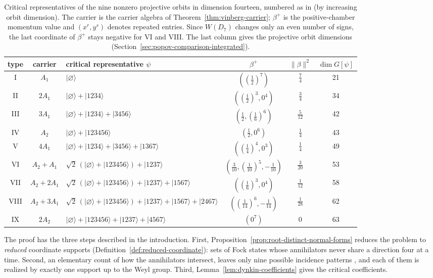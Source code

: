 \documentclass{article}
\theoremstyle{definition}
\theoremstyle{remark}
\newcommand{\ket}[1]{\lvert #1\rangle}
\newcommand{\norm}[1]{\lVert #1\rVert}
\begin{document}
\begin{table}[t]
\centering
\renewcommand{\arraystretch}{1.18}
\small
\begin{tabular}{c c l c c c}
\toprule
type & carrier & critical representative $\psi$ & $\beta^+$ &
$\norm\beta^2$ &
$\dim G[\psi]$\\
\midrule
I & $A_1$ & $\ket\varnothing$
  & $((\frac12)^7)$ & $\frac74$ & 21\\
II & $2A_1$ & $\ket\varnothing+\ket{1234}$
  & $((\frac12)^3,0^4)$ & $\frac34$ & 34\\
III & $3A_1$ & $\ket\varnothing+\ket{1234}+\ket{3456}$
  & $(\frac12,(\frac16)^6)$ & $\frac5{12}$ & 42\\
IV & $A_2$ & $\ket\varnothing+\ket{123456}$
  & $(\frac12,0^6)$ & $\frac14$ & 43\\
V & $4A_1$ & $\ket\varnothing+\ket{1234}+\ket{3456}+\ket{1367}$
  & $((\frac14)^4,0^3)$ & $\frac14$ & 49\\
VI & $A_2{+}A_1$ & $\sqrt2\,(\ket\varnothing+\ket{123456})+\ket{1237}$
  & $(\frac3{10},(\frac1{10})^5,-\frac1{10})$ & $\frac3{20}$ & 53\\
VII & $A_2{+}2A_1$ & $\sqrt2\,(\ket\varnothing+\ket{123456})+\ket{1237}+\ket{1567}$
  & $((\frac16)^3,0^4)$ & $\frac1{12}$ & 58\\
VIII & $A_2{+}3A_1$ & $\sqrt2\,(\ket\varnothing+\ket{123456})+\ket{1237}+\ket{1567}+\ket{2467}$
  & $((\frac1{14})^6,-\frac1{14})$ & $\frac1{28}$ & 62\\
IX & $2A_2$ & $\ket\varnothing+\ket{123456}+\ket{1237}+\ket{4567}$
  & $(0^7)$ & $0$ & 63\\
\bottomrule
\end{tabular}
\caption{Critical representatives of the nine nonzero projective orbits in
dimension fourteen, numbered as in \cite[Table~1]{Gatti_dim13} (by increasing
orbit dimension). The carrier is the carrier algebra of
Theorem~\ref{thm:vinberg-carrier}; $\beta^+$ is the positive-chamber
momentum value and $(x^r,y^s)$ denotes repeated entries. Since $W(D_7)$ changes only an even number of
signs, the last coordinate of $\beta^+$ stays negative for VI and VIII. The
last column gives the projective orbit dimensions
(Section~\ref{sec:popov-comparison-integrated}).}
\label{tab:s14-orbits}
\end{table}

The proof has the three steps described in the introduction. First,
Proposition~\ref{prop:root-distinct-normal-forms} reduces the problem to
\emph{reduced} coordinate supports (Definition~\ref{def:reduced-coordinate}):
sets of Fock states whose annihilators never share a direction four at a
time. Second, an elementary count of how the annihilators intersect, leaves only nine possible
incidence patterns \cite{BhojaKrasnov2025}, and each of them is realized by exactly one support up to
the Weyl group. Third, Lemma~\ref{lem:dynkin-coefficients} gives the critical
coefficients.
\end{document}
